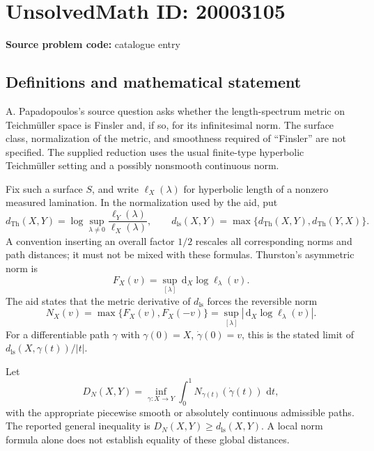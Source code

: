 \documentclass[11pt]{article}
\newcommand{\dd}{\,\mathrm{d}}
\begin{document}
\section*{UnsolvedMath ID: 20003105}
\textbf{Source problem code:} catalogue entry
\subsection{Definitions and mathematical statement}
A. Papadopoulos's source question asks whether the length-spectrum metric on Teichm\"uller space is Finsler and, if so, for its infinitesimal norm. The surface class, normalization of the metric, and smoothness required of ``Finsler'' are not specified. The supplied reduction uses the usual finite-type hyperbolic Teichm\"uller setting and a possibly nonsmooth continuous norm.

Fix such a surface \(S\), and write \(\ell_X(\lambda)\) for hyperbolic length of a nonzero measured lamination. In the normalization used by the aid, put
\[
 d_{\mathrm{Th}}(X,Y)=\log\sup_{\lambda\ne0}\frac{\ell_Y(\lambda)}{\ell_X(\lambda)},\qquad
 d_{\mathrm{ls}}(X,Y)=\max\{d_{\mathrm{Th}}(X,Y),d_{\mathrm{Th}}(Y,X)\}.
\]
A convention inserting an overall factor \(1/2\) rescales all corresponding norms and path distances; it must not be mixed with these formulas. Thurston's asymmetric norm is
\[
 F_X(v)=\sup_{[\lambda]}\dd_X\log\ell_\lambda(v).
\]
The aid states that the metric derivative of \(d_{\mathrm{ls}}\) forces the reversible norm
\[
 N_X(v)=\max\{F_X(v),F_X(-v)\}
       =\sup_{[\lambda]}|\dd_X\log\ell_\lambda(v)|.
\]
For a differentiable path \(\gamma\) with \(\gamma(0)=X\), \(\dot\gamma(0)=v\), this is the stated limit of \(d_{\mathrm{ls}}(X,\gamma(t))/|t|\).

Let
\[
 D_N(X,Y)=\inf_{\gamma:X\to Y}\int_0^1N_{\gamma(t)}(\dot\gamma(t))\,\dd t,
\]
with the appropriate piecewise smooth or absolutely continuous admissible paths. The reported general inequality is \(D_N(X,Y)\geq d_{\mathrm{ls}}(X,Y)\). A local norm formula alone does not establish equality of these global distances.
\end{document}
